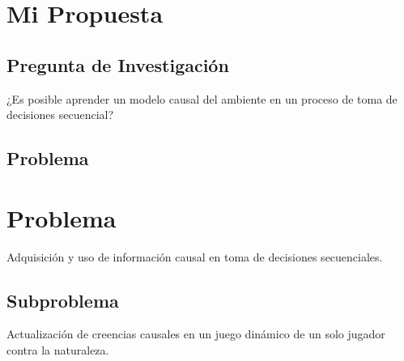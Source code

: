 \documentclass[11pt]{article}
\theoremstyle{plain}
\begin{document}
\section{Mi Propuesta}
\subsection{Pregunta de Investigación}
¿Es posible aprender un modelo causal del ambiente en un proceso de toma de decisiones secuencial?
\subsection{Problema}
\section{Problema}
Adquisición y uso de información causal en toma de decisiones secuenciales.
\subsection{Subproblema}
Actualización de creencias causales en un juego dinámico de un solo jugador contra la naturaleza. 
\end{document}
